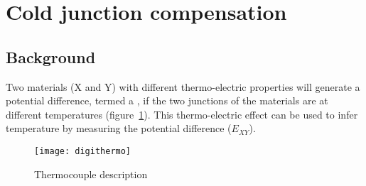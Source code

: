 
\section{Cold junction compensation}
\subsection{Background}
Two materials (X and Y) with different thermo-electric properties will generate a potential difference, termed a , if the two junctions of the materials are at different temperatures (figure~\ref{fig:digi:thermo}). This thermo-electric effect can be used to infer temperature by measuring the potential difference ($E_{XY}$). 
\begin{figure}[htbp]
	\centering
	\texttt{[image: digithermo]}
	\caption{Thermocouple description}
	\label{fig:digi:thermo}
\end{figure}

